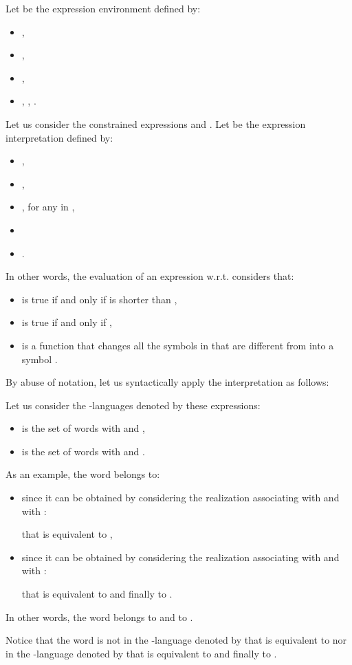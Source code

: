 \documentclass[a4paper]{llncs}
\begin{document}
  \begin{example}\label{ex exp cons lang}
    Let  be the expression environment defined by:
    \begin{itemize}
      \item ,
      \item ,
      \item ,
      \item , , .
    \end{itemize}    
    Let us consider the constrained expressions  and . 
    Let  be the expression interpretation defined by:
    \begin{itemize}
      \item ,
      \item ,
      \item , for any  in , 
      \item 
      \item .
    \end{itemize}
    
    In other words, the evaluation of an expression w.r.t.  considers that:
    \begin{itemize}
      \item  is true if and only if  is shorter than ,
      \item  is true if and only if ,
      \item  is a function that changes all the symbols in  that are different from  into a symbol .
    \end{itemize}
    
    By abuse of notation, let us syntactically apply the interpretation as follows:
    
    
    Let us consider the -languages denoted by these expressions:
    \begin{itemize}
      \item  is the set of words  with  and ,
      \item  is the set of words  with  and . 
    \end{itemize}
    
    As an example, the word  belongs to:
    \begin{itemize}
      \item  since it can be obtained by considering the realization  associating  with  and  with : 
    
that is equivalent to  ,
      \item  since it can be obtained by considering the realization  associating  with  and  with : 
    
    that is equivalent to  and finally to .
    \end{itemize}
    
    In other words, the word  belongs to  and to .
    
    Notice that the word  is not in the -language denoted by  that is equivalent to  nor in the -language denoted by  that is equivalent to  and finally to . 
  \end{example}
\end{document}
